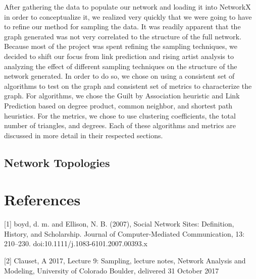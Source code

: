 \documentclass{article}
\begin{document}
After gathering the data to populate our network and loading it into NetworkX in order to conceptualize it, we realized very quickly that we were going to have to refine our method for sampling the data.  It was readily apparent that the graph generated was not very correlated to the structure of the full network.  Because most of the project was spent refining the sampling techniques, we decided to shift our focus from link prediction and rising artist analysis to analyzing the effect of different sampling techniques on the structure of the network generated.  In order to do so, we chose on using a consistent set of algorithms to test on the graph and consistent set of metrics to characterize the graph.  For algorithms, we chose the Guilt by Association heuristic and Link Prediction based on degree product, common neighbor, and shortest path heuristics.  For the metrics, we chose to use clustering coefficients, the total number of triangles, and degrees.  Each of these algorithms and metrics are discussed in more detail in their respected sections.

\subsection{Network Topologies}


\section*{References}
\small

[1] boyd, d. m. and Ellison, N. B. (2007), Social Network Sites: Definition, History, and Scholarship. Journal of Computer-Mediated Communication, 13: 210–230. doi:10.1111/j.1083-6101.2007.00393.x

[2] Clauset, A 2017, Lecture 9: Sampling, lecture notes, Network Analysis and Modeling, University of Colorado Boulder, delivered 31 October 2017
\end{document}
